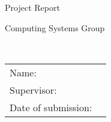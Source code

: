 \begin{titlepage}
\begin{addmargin}[-1cm]{-3cm}
	\begin{center}
		\begingroup
		\Huge
		Project Report \\ \bigskip
		\endgroup

		\begingroup
		\Large
		Computing Systems Group \\ \smallskip
		\endgroup

		\begingroup
		\Huge
		\myTitle \\ \smallskip
		\endgroup

		\vfill
		\hfill
	\end{center}
	\begingroup
	\large
	\noindent
	\begin{tabular}{ll}
		Name: & \myName \\
		Supervisor: & \mySupervisor \\
		Date of submission: & \mySubmissionDate \\
	\end{tabular}
	\endgroup
\end{addmargin}
\end{titlepage}
\cleardoublepage
